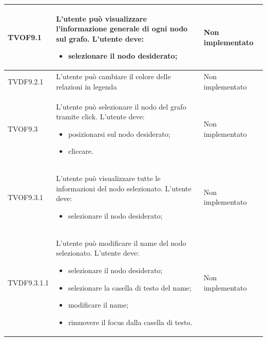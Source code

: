 \documentclass[openany,12pt,a4paper]{report}
\begin{document}
\begin{longtable}{| p{3cm} |p{8cm} | p{2.5cm} |}
	
	\newline TVOF9.1&
	\newline L'utente può visualizzare l'informazione generale di ogni nodo sul grafo. L'utente deve:
	\begin{itemize}
		\item selezionare il nodo desiderato;
	\end{itemize}&
	\newline Non implementato
	\\[1em]
	\hline
	
	\newline TVDF9.2.1&
	\newline L'utente può cambiare il colore delle relazioni in legenda&
	\newline  Non implementato
	\\[1em]
	\hline
	
	\newline TVOF9.3&
	\newline L'utente può selezionare il nodo del grafo tramite click. L'utente deve:
	\begin{itemize}
		\item posizionarsi sul nodo desiderato;
		\item cliccare.
	\end{itemize}&
	\newline Non implementato
	\\[1em]
	\hline
	
	\newline TVOF9.3.1&
	\newline L'utente può visualizzare tutte le informazioni del nodo selezionato. L'utente deve:
	\begin{itemize}
		\item selezionare il nodo desiderato;
	\end{itemize}&
	\newline Non implementato
	\\[1em]
	\hline
	
	\newline TVDF9.3.1.1&
	\newline L'utente può modificare il name del nodo selezionato. L'utente deve:
	\begin{itemize}
		\item selezionare il nodo desiderato;
		\item selezionare la casella di testo del name;
		\item modificare il name;
		\item rimuovere il focus dalla casella di testo.
	\end{itemize}&
	\newline Non implementato
	\\[1em]
	\hline
	

\end{longtable}
\end{document}
